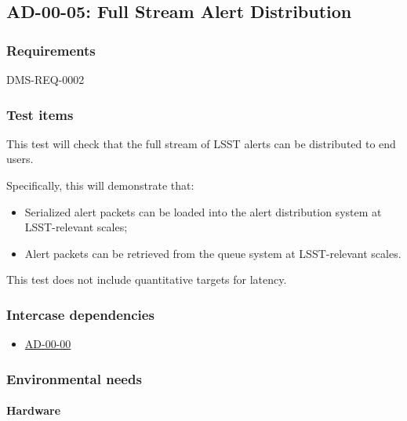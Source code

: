 \subsection{AD-00-05: Full Stream Alert Distribution}
\label{ad-00-05}

\subsubsection{Requirements}

DMS-REQ-0002

\subsubsection{Test items}
\label{ad-00-05-items}

This test will check that the full stream of LSST alerts can be distributed to end users.

Specifically, this will demonstrate that:

\begin{itemize}

  \item{Serialized alert packets can be loaded into the alert distribution system at LSST-relevant scales;}
  \item{Alert packets can be retrieved from the queue system at LSST-relevant scales.}

\end{itemize}

This test does not include quantitative targets for latency.

\subsubsection{Intercase dependencies}

\begin{itemize}

  \item{\hyperref[ad-00-00]{AD-00-00}}

\end{itemize}

\subsubsection{Environmental needs}

\paragraph{Hardware}

